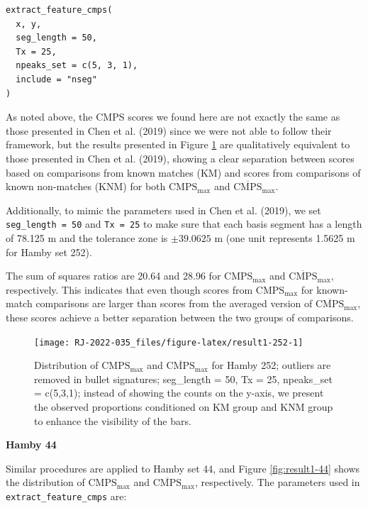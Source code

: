 \begin{verbatim}
extract_feature_cmps(
  x, y,
  seg_length = 50,
  Tx = 25,
  npeaks_set = c(5, 3, 1),
  include = "nseg"
)
\end{verbatim}

As noted above, the CMPS scores we found here are not exactly the same as those presented in Chen et al. (2019) since we were not able to follow their framework, but the results presented in Figure \ref{fig:result1-252} are qualitatively equivalent to those presented in Chen et al. (2019), showing a clear separation between scores based on comparisons from known matches (KM) and scores from comparisons of known non-matches (KNM) for both \(\mathrm{CMPS_{max}}\) and \(\mathrm{\overline{CMPS}_{max}}\).

Additionally, to mimic the parameters used in Chen et al. (2019), we set \texttt{seg\_length\ =\ 50} and \texttt{Tx\ =\ 25} to make sure that each basis segment has a length of 78.125 \textmu m and the tolerance zone is \(\pm 39.0625\) \textmu m (one unit represents 1.5625 \textmu m for Hamby set 252).

The sum of squares ratios are 20.64 and 28.96 for \(\mathrm{CMPS_{max}}\) and \(\mathrm{\overline{CMPS}_{max}}\), respectively.
This indicates that even though scores from \(\mathrm{CMPS_{max}}\) for known-match comparisons are larger than scores from the averaged version of \(\mathrm{\overline{CMPS}_{max}}\), these scores achieve a better separation between the two groups of comparisons.

\begin{figure}

{\centering \texttt{[image: RJ-2022-035\_files/figure-latex/result1-252-1]} 

}

\caption{Distribution of $\mathrm{CMPS_{max}}$ and $\mathrm{\overline{CMPS}_{max}}$ for Hamby 252; outliers are removed in bullet signatures; seg\_length = 50, Tx = 25, npeaks\_set = c(5,3,1); instead of showing the counts on the y-axis, we present the observed proportions conditioned on KM group and KNM group to enhance the visibility of the bars. }\label{fig:result1-252}
\end{figure}

\textbf{Hamby 44}

Similar procedures are applied to Hamby set 44, and Figure \ref{fig:result1-44} shows the distribution of \(\mathrm{CMPS_{max}}\) and \(\mathrm{\overline{CMPS}_{max}}\), respectively.
The parameters used in \texttt{extract\_feature\_cmps} are:

